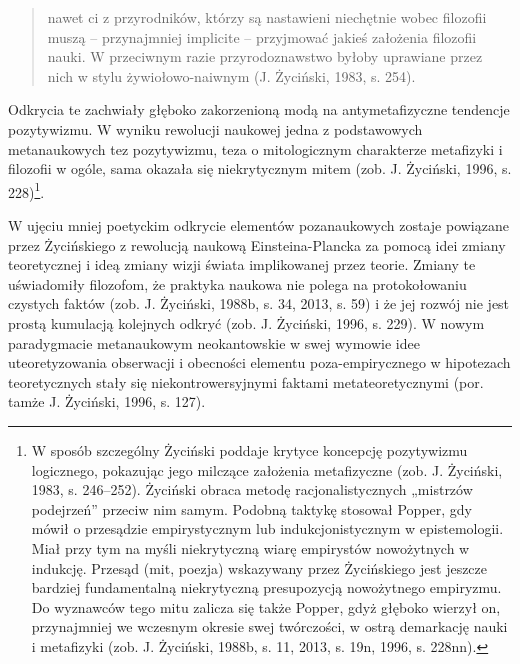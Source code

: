 \documentclass{article}
\begin{document}
\begin{quotation}
nawet ci z przyrodników, którzy są nastawieni niechętnie wobec filozofii muszą – przynajmniej implicite – przyjmować
jakieś założenia filozofii nauki. W przeciwnym razie przyrodoznawstwo byłoby uprawiane przez nich w stylu
żywiołowo-naiwnym \label{ref:RNDzLB3079QHH}(J. Życiński, 1983, s. 254). 

\end{quotation}
Odkrycia te zachwiały głęboko zakorzenioną modą na antymetafizyczne tendencje pozytywizmu. W wyniku rewolucji naukowej
jedna z podstawowych metanaukowych tez pozytywizmu, teza o mitologicznym charakterze metafizyki i filozofii w ogóle,
sama okazała się niekrytycznym mitem \label{ref:RNDw5Xs923WOa}(zob. J. Życiński, 1996, s. 228)\footnote{W sposób
szczególny Życiński poddaje krytyce koncepcję pozytywizmu logicznego, pokazując jego milczące założenia metafizyczne
\label{ref:RNDk96fcXirdq}(zob. J. Życiński, 1983, s. 246–252). Życiński obraca metodę racjonalistycznych „mistrzów
podejrzeń” przeciw nim samym. Podobną taktykę stosował Popper, gdy mówił o przesądzie empirystycznym lub
indukcjonistycznym w epistemologii. Miał przy tym na myśli niekrytyczną wiarę empirystów nowożytnych w indukcję.
Przesąd (mit, poezja) wskazywany przez Życińskiego jest jeszcze bardziej fundamentalną niekrytyczną presupozycją
nowożytnego empiryzmu. Do wyznawców tego mitu zalicza się także Popper, gdyż głęboko wierzył on, przynajmniej we
wczesnym okresie swej twórczości, w ostrą demarkację nauki i metafizyki \label{ref:RNDdtZAuOTDND}(zob. J. Życiński,
1988b, s. 11, 2013, s. 19n, 1996, s. 228nn). }.

W ujęciu mniej poetyckim odkrycie elementów pozanaukowych zostaje powiązane przez Życińskiego z rewolucją naukową
Einsteina-Plancka za pomocą idei zmiany teoretycznej i ideą zmiany wizji świata implikowanej przez teorie. Zmiany te
uświadomiły filozofom, że praktyka naukowa nie polega na protokołowaniu czystych faktów \label{ref:RNDi0g21xRjLd}(zob.
J. Życiński, 1988b, s. 34, 2013, s. 59) i że jej rozwój nie jest prostą kumulacją kolejnych odkryć
\label{ref:RNDl7y894RdpX}(zob. J. Życiński, 1996, s. 229). W nowym paradygmacie metanaukowym neokantowskie w swej
wymowie idee uteoretyzowania obserwacji i obecności elementu poza-empirycznego w hipotezach teoretycznych stały się
niekontrowersyjnymi faktami metateoretycznymi \label{ref:RNDLhcTxbq259}(por. tamże J. Życiński, 1996, s. 127).
\end{document}
